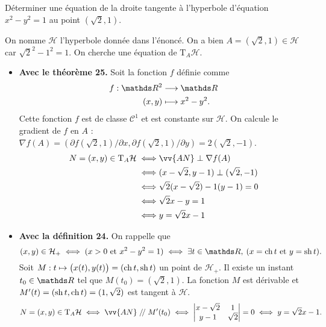 \begin{exo}
	\begin{slshape}
		Déterminer une équation de la droite tangente à l'hyperbole d'équation $x^2 - y^2 = 1$ au point $(\sqrt{2}, 1)$.
	\end{slshape}

	On nomme $\mathcal{H}$ l'hyperbole donnée dans l'énoncé.
	On a bien $A = (\sqrt{2}, 1) \in \mathcal{H}$ car $\sqrt{2}^2 - 1^2 = 1$.
	On cherche une équation de $\mathrm{T}_A\mathcal{H}$.

	\begin{itemize}
		\item \textbf{Avec le théorème 25.} Soit la fonction $f$ définie comme
			\begin{align*}
				f: \R^2 &\longrightarrow \R \\
				(x,y) &\longmapsto x^2 - y^2.
			\end{align*}
			Cette fonction $f$ est de classe $\mathcal{C}^1$ et est constante sur $\mathcal{H}$.
			On calcule le gradient de $f$ en $A$ : $\nabla f(A) = (\partial f(\sqrt{2},1) / \partial x, \partial f(\sqrt{2},1) / \partial y) = 2(\sqrt{2}, -1)$.
			\begin{align*}
				N = (x,y) \in \mathrm{T}_{A}\mathcal{H} \iff& \vv{AN} \perp \nabla f(A) \\
				\iff& (x-\sqrt{2}, y-1) \perp (\sqrt{2}, -1) \\
				\iff& \sqrt{2}(x-\sqrt{2}) - 1(y-1) = 0 \\
				\iff& \sqrt{2}x - y = 1 \\
				\iff& y = \sqrt{2}x - 1 \\
			\end{align*}
		\item \textbf{Avec la définition 24.}
			On rappelle que \[
				(x,y) \in \mathcal{H}_+ \iff
				(x > 0 \text{ et } x^2 - y^2 = 1)
				\iff \exists t \in \R,\: (x = \ch t \text{ et } y = \sh t)
			.\]
			Soit $M : t \mapsto \big(x(t), y(t)\big) = (\operatorname{ch} t, \operatorname{sh} t)$ un point de $\mathcal{H}_+$.
			Il existe un instant $t_0 \in \R$ tel que $M(t_0) = (\sqrt{2}, 1)$.
			La fonction $M$ est dérivable et $M'(t) = (\operatorname{sh} t, \operatorname{ch} t) = (1, \sqrt{2})$ est tangent à $\mathcal{H}$.
			\begin{align*}
				N=(x,y) \in \mathrm{T}_A \mathcal{H} \iff \vv{AN} \mathrel{/\!/} M'(t_0) \iff
				\begin{vmatrix}
					x-\sqrt{2} & 1\\
					y - 1 & \sqrt{2}
				\end{vmatrix} = 0
				\iff y = \sqrt{2} x - 1.
			\end{align*}
	\end{itemize}
\end{exo}

